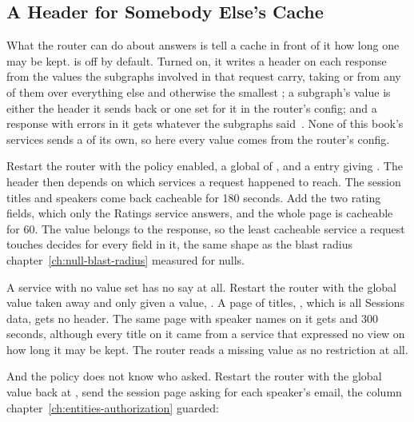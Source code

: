 \subsection{A Header for Somebody Else's Cache}

%
What the router can do about answers is tell a cache in front of it how long
one may be kept.  is off by default. Turned on, it
writes a  header on each response from the values the
subgraphs involved in that request carry, taking  or
 from any of them over everything else and otherwise the
smallest ; a subgraph's value is either the 
header it sends back or one set for it in the router's config; and a response
with errors in it gets  whatever the subgraphs
said~\autocite{cosmocachecontrol}. None of this book's services sends a  of its own, so here
every value comes from the router's config.

%
Restart the router with the policy enabled, a global  of
, and a  entry giving 
. The header then depends on which services a request
happened to reach. The session
titles and speakers come back cacheable for 180 seconds. Add
the two rating fields, which only the Ratings service answers, and the whole
page is cacheable for 60. The value belongs to the response, so the least cacheable
service a request touches decides for every field in it, the same shape as the
blast radius chapter~\ref{ch:null-blast-radius} measured for nulls.

%
A service with no value set has no say at all. Restart the router
with the global value taken away and only  given a value,
. A page of titles, ,
which is all Sessions data, gets no  header. The same page
with speaker names on it gets  and 300 seconds, although every
title on it came from a service that expressed no view on how long it may be
kept. The router reads a missing value as no restriction at all.

%
And the policy does not know who asked. Restart the router with the global value back at
, send the session page asking for each speaker's email, the column
chapter~\ref{ch:entities-authorization} guarded:

